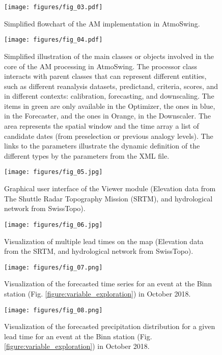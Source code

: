 \documentclass[gmdd]{copernicus}
\begin{document}
\begin{figure}[t]
	\texttt{[image: figures/fig\_03.pdf]}
	\caption{Simplified flowchart of the AM implementation in AtmoSwing.}
	\label{figure:flowchart_modules_atmoswing}
\end{figure}

\begin{figure*}[t]
	\texttt{[image: figures/fig\_04.pdf]}
	\caption{Simplified illustration of the main classes or objects involved in the core of the AM processing in AtmoSwing. The processor class interacts with parent classes that can represent different entities, such as different reanalysis datasets, predictand, criteria, scores, and in different contexts: calibration, forecasting, and downscaling. The items in green are only available in the Optimizer, the ones in blue, in the Forecaster, and the ones in Orange, in the Downscaler. The area represents the spatial window and the time array a list of candidate dates (from preselection or previous analogy levels). The links to the parameters illustrate the dynamic definition of the different types by the parameters from the XML file.}
	\label{figure:code_diagram}
\end{figure*}

\begin{figure*}[t]
	\texttt{[image: figures/fig\_05.jpg]}
	\caption{Graphical user interface of the Viewer module (Elevation data from The Shuttle Radar Topography Mission (SRTM), and hydrological network from SwissTopo).}
	\label{figure:atmoswing-viewer-gui}
\end{figure*}

\begin{figure*}[t]
	\texttt{[image: figures/fig\_06.jpg]}
	\caption{Visualization of multiple lead times on the map (Elevation data from the SRTM, and hydrological network from SwissTopo).}
	\label{figure:atmoswing-viewer-snail}
\end{figure*}

\begin{figure}[t]
	\texttt{[image: figures/fig\_07.png]}
	\caption{Visualization of the forecasted time series for an event at the Binn station (Fig. \ref{figure:variable_exploration}) in October 2018.}
	\label{figure:atmoswing-viewer-timeseries}
\end{figure}

\begin{figure}[t]
	\texttt{[image: figures/fig\_08.png]}
	\caption{Visualization of the forecasted precipitation distribution for a given lead time for an event at the Binn station (Fig. \ref{figure:variable_exploration}) in October 2018.}
	\label{figure:atmoswing-viewer-distribution}
\end{figure}
\end{document}
